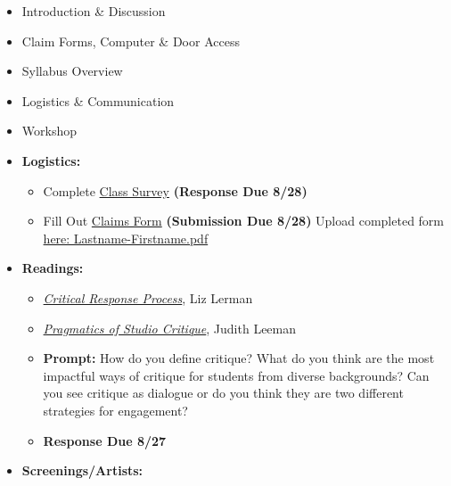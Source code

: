 \def\fri{8/28}%
\def\tues{8/25}%
\def\thur{8/27}%
% 
\begin{itemize}[noitemsep,topsep=0pt,leftmargin=*]
      \item Introduction \& Discussion
      \item Claim Forms, Computer \& Door Access
      \item Syllabus Overview
      \item Logistics \& Communication
      \item Workshop
\end{itemize}
\vspace{1em}
\begin{itemize}[noitemsep,topsep=0pt,leftmargin=*]
      \item \textbf{Logistics:}
            \begin{itemize}
                  \item Complete \href{https://forms.gle/t2oFW9zMPq9WHAhT7}{Class Survey} \textbf{(Response Due \fri)}
                  \item Fill Out \href{https://drive.google.com/file/d/1lfmTV3G5hzwf4YUvxlSUWwahs2fQIglq/view}{Claims Form} \textbf{(Submission Due \fri)}
                        \newline Upload completed form \href{https://osu.app.box.com/f/572052d11c8a4e3ab7d1320328d028a0}{here: Lastname-Firstname.pdf}
            \end{itemize}
      \item \textbf{Readings:}
            \begin{itemize}
                  \item \emph{\href{https://drive.google.com/file/d/1tnvKJBaXn2kFXjp-KB8p0_dkKuw1R4fu/view?usp=sharing}{Critical Response Process}}, Liz Lerman
                  \item \emph{\href{https://drive.google.com/file/d/1vUej0gK5nckVl6hvf68lcHJrh1w73h12/view?usp=sharing}{Pragmatics of Studio Critique}}, Judith Leeman
                  \item \textbf{Prompt:} How do you define critique? What do you think are the most impactful ways of critique for students from diverse backgrounds? Can you see critique as dialogue or do you think they are two different strategies for engagement?
                  \item \textbf{Response Due \thur}
            \end{itemize}
      \item \textbf{Screenings/Artists:}

\end{itemize}
